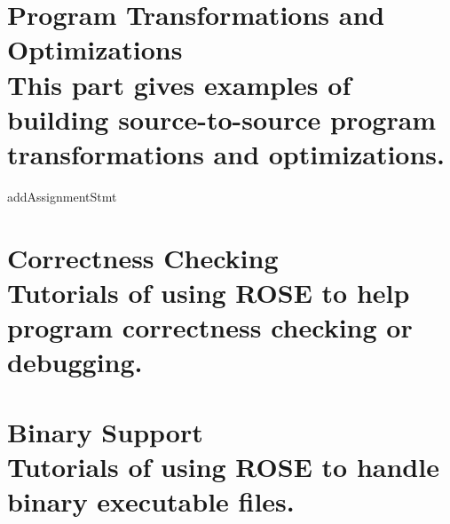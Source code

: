 \documentclass[10pt]{book}
\begin{document}
\part[Program Transformations and Optimizations]{ Program Transformations
and Optimizations \\
\vspace{1.0in}
\normalsize{This part gives examples of building source-to-source program
transformations and optimizations.}
}






 {addAssignmentStmt}











\part[Correctness Checking]{ Correctness Checking \\
\vspace{1.0in}
\normalsize{Tutorials of using ROSE to help program correctness checking or
debugging.}
}




\part[Binary Support]{ Binary Support \\
\vspace{1.0in}
\normalsize{Tutorials of using ROSE to handle binary executable files.}
}




\end{document}
